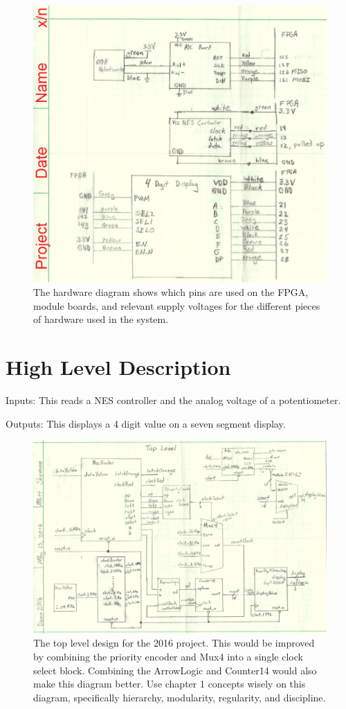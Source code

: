 \documentclass[a4paper]{article}
\begin{document}
\begin{figure}[h]
  \centering
    \includegraphics[width=.8\textwidth]{Images/Hardware.png}
	\caption{The hardware diagram shows which pins are used on the FPGA, module boards, and relevant supply voltages for the different pieces of hardware used in the system.}
    \label{fig:Hardware}
\end{figure}


\newpage
\section{High Level Description}
Inputs:  This reads a NES controller and the analog voltage of a potentiometer.

Outputs:  This displays a 4 digit value on a seven segment display.

\begin{figure}[h]
  \centering
    \includegraphics[width=.5\textwidth]{Images/TopLevel.png}
	\caption{The top level design for the 2016 project.  This would be improved by combining the priority encoder and Mux4 into a single clock select block.  Combining the ArrowLogic and Counter14 would also make this diagram better.  Use chapter 1 concepts wisely on this diagram, specifically hierarchy, modularity, regularity, and discipline.}
    \label{fig:TopLevelDiagram}
\end{figure}
\end{document}
